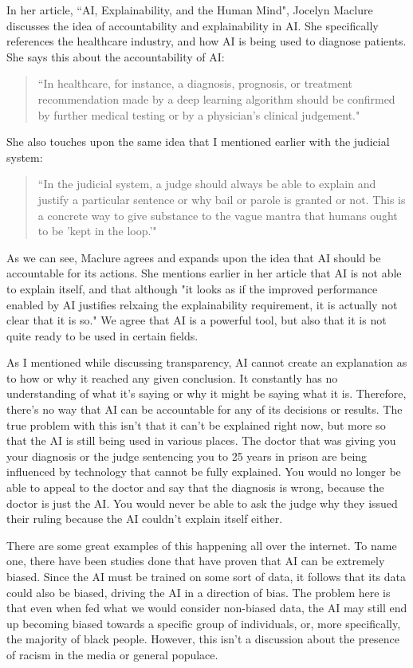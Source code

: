 \documentclass[12pt]{article}
\begin{document}
    In her article, ``AI, Explainability, and the Human Mind", Jocelyn Maclure discusses the idea
    of accountability and explainability in AI. She specifically references the healthcare industry,
    and how AI is being used to diagnose patients. She says this about the accountability of AI:
    \begin{quote}
      ``In healthcare, for instance, a diagnosis, prognosis, or treatment recommendation made by a
      deep learning algorithm should be confirmed by further medical testing or by a physician's
      clinical judgement." \cite{MaclureAI}
    \end{quote}
    She also touches upon the same idea that I mentioned earlier with the judicial system:
    \begin{quote}
      ``In the judicial system, a judge should always be able to explain and justify a particular
      sentence or why bail or parole is granted or not. This is a concrete way to give substance
      to the vague mantra that humans ought to be 'kept in the loop.'" \cite{MaclureAI}
    \end{quote}
    As we can see, Maclure agrees and expands upon the idea that AI should be accountable for its
    actions. She mentions earlier in her article that AI is not able to explain itself, and that
    although "it looks as if the improved performance enabled by AI justifies relxaing the explainability
    requirement, it is actually not clear that it is so." \cite{MaclureAI} We agree that AI is a
    powerful tool, but also that it is not quite ready to be used in certain fields.

    As I mentioned while discussing transparency, AI cannot create an explanation as to how or why
    it reached any given conclusion. It constantly has no understanding of what it's saying or
    why it might be saying what it is. Therefore, there's no way that AI can be accountable for 
    any of its decisions or results. The true problem with this isn't that it can't be explained
    right now, but more so that the AI is still being used in various places. The doctor that was
    giving you your diagnosis or the judge sentencing you to 25 years in prison are being influenced
    by technology that cannot be fully explained. You would no longer be able to appeal to the doctor
    and say that the diagnosis is wrong, because the doctor is just the AI. You would never be able
    to ask the judge why they issued their ruling because the AI couldn't explain itself either.

    There are some great examples of this happening all over the internet. To name one, there have
    been studies done that have proven that AI can be extremely biased. Since the AI must be trained
    on some sort of data, it follows that its data could also be biased, driving the AI in a direction
    of bias. The problem here is that even when fed what we would consider non-biased data, the AI
    may still end up becoming biased towards a specific group of individuals, or, more specifically,
    the majority of black people. However, this isn't a discussion about the presence of racism in 
    the media or general populace.
\end{document}
